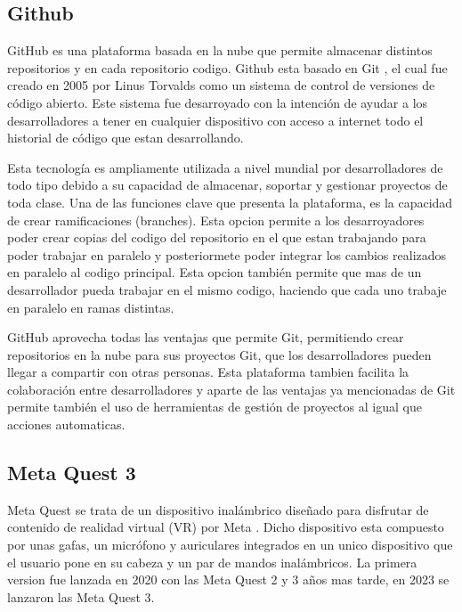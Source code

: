 \documentclass[a4paper, 12pt]{book}
\begin{document}
\subsection{Github}
\label{subsect:github}

GitHub es una plataforma basada en la nube que permite almacenar distintos repositorios y en cada repositorio codigo. Github esta basado en Git \cite{git}, el cual fue creado en 2005 por Linus Torvalds como un sistema de control de versiones de código abierto.
Este sistema fue desarroyado con la intención de ayudar a los desarrolladores a tener en cualquier dispositivo con acceso a internet todo el historial de código que estan desarrollando. 

Esta tecnología es ampliamente utilizada a nivel mundial por desarrolladores de todo tipo debido a su capacidad de almacenar, soportar y gestionar proyectos de toda clase. Una de las funciones clave que presenta la plataforma, es la capacidad de crear ramificaciones (branches). Esta opcion permite a los desarroyadores poder crear copias del codigo del repositorio en el que 
estan trabajando para poder trabajar en paralelo y posteriormete poder integrar los cambios realizados en paralelo al codigo principal. Esta opcion también permite que mas de un desarrollador pueda trabajar en el mismo codigo, haciendo que cada uno trabaje en paralelo en ramas distintas. 

GitHub aprovecha todas las ventajas que permite Git, permitiendo crear repositorios en la nube para sus proyectos Git, que los desarrolladores pueden llegar a compartir con otras personas. Esta plataforma tambien facilita la colaboración entre desarrolladores y aparte de las ventajas ya mencionadas de Git permite también el uso de herramientas de gestión de proyectos al igual que acciones automaticas. 

\subsection{Meta Quest 3}
\label{subsec:metaquest}

Meta Quest se trata de un dispositivo inalámbrico diseñado para disfrutar de contenido de realidad virtual (VR) por Meta \cite{meta_company_info}. Dicho dispositivo esta compuesto por unas gafas, un micrófono y auriculares integrados en un unico dispositivo que el usuario pone en su cabeza y un par de mandos inalámbricos. 
La primera version fue lanzada en 2020 con las Meta Quest 2 y 3 años mas tarde, en 2023 se lanzaron las Meta Quest 3. 
\end{document}
